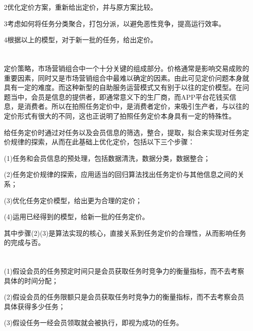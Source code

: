 \documentclass{ctexart}
\begin{document}
\textcircled{\small{2}}优化定价方案，重新给出定价，并与原方案比较。


\textcircled{\small{3}}考虑如何将任务分类聚合，打包分派，以避免恶性竞争，提高运行效率。

\textcircled{\small{4}}根据以上的模型，对于新一批的任务，给出定价。



\section{}
定价策略，市场营销组合中一个十分关键的组成部分。价格通常是影响交易成败的重要因素，同时又是市场营销组合中最难以确定的因素。由此可见定价问题本身就具有一定的难度。而这种新型的自助服务运营模式又有别于以往的定价模型。在问题当中，会员是信息的提供者，即通常意义下的生厂商，而APP平台花钱买信息，是消费者。所以在拍照任务定价中，是消费者定价，来吸引生产者，与以往的定价形式有很大的不同，这也正说明了拍照任务定价本身具有一定的特殊性。

给任务定价时通过对任务以及会员信息的筛选，整合，提取，拟合来实现对任务定价规律的探索，从而在此基础上优化定价，包括以下三个步骤：

(1)任务和会员信息的预处理，包括数据清洗，数据分类，数据整合；

(2)任务定价规律的探索，应用适当的回归算法找出任务定价与其他信息之间的关系；

(3)优化任务定价模型，给出更为合理的定价；


(4)运用已经得到的模型，给新一批的任务定价。

其中步骤(2)(3)是算法实现的核心，直接关系到任务定价的合理性，从而影响任务的完成与否。

\section{}

(1)假设会员的任务预定时间只是会员获取任务时竞争力的衡量指标，而不去考察具体的时间分配；

(2)假设会员的任务限额只是会员获取任务时竞争力的衡量指标，而不去考察会员具体获得多少任务；

(3)假设任务一经会员领取就会被执行，即视为成功的任务。
\section{}
\end{document}
